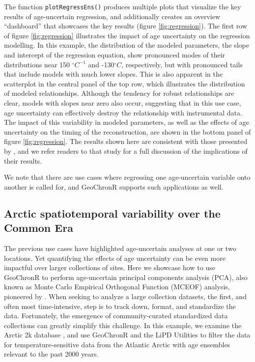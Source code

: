 \documentclass[gchron, manuscript]{copernicus}
\begin{document}
The function \texttt{plotRegressEns()} produces multiple plots that visualize the key results of age-uncertain regression, and additionally creates an overview ``dashboard'' that showcases the key results (figure \ref{fig:regression}).
The first row of figure \ref{fig:regression} illustrates the impact of age uncertainty on the regression modelling.
In this example, the distribution of the modeled parameters, the slope and intercept of the regression equation, show pronounced modes of their distributions near 150 \(^\circ C^{-1}\) and -130\(^\circ C\), respectively, but with pronounced tails that include models with much lower slopes.
This is also apparent in the scatterplot in the central panel of the top row, which illustrates the distribution of modeled relationships.
Although the tendency for robust relationships are clear, models with slopes near zero also occur, suggesting that in this use case, age uncertainty can effectively destroy the relationship with instrumental data.
The impact of this variability in modeled parameters, as well as the effects of age uncertainty on the timing of the reconstruction, are shown in the bottom panel of figure \ref{fig:regression}.
The results shown here are consistent with those presented by \citet{Boldt2015}, and we refer readers to that study for a full discussion of the implications of their results.

We note that there are use cases where regressing one age-uncertain variable onto another is called for, and GeoChronR supports such applications as well.

\hypertarget{sec:pca}{%
\subsection{Arctic spatiotemporal variability over the Common Era}\label{sec:pca}}

The previous use cases have highlighted age-uncertain analyses at one or two locations. Yet quantifying the effects of age uncertainty can be even more impactful over larger collections of sites.
Here we showcase how to use GeoChronR to perform age-uncertain principal components analysis (PCA), also known as Monte Carlo Empirical Orthogonal Function (MCEOF) analysis, pioneered by \citet{anchukaitis2013mceof}.
When seeking to analyze a large collection datasets, the first, and often most time-intensive, step is to track down, format, and standardize the data.
Fortunately, the emergence of community-curated standardized data collections \citetext{\citealp[e.g.][]{PAGES2K_ngeo2013_short}; \citealp{pages2k2017}; \citealp[ ]{kaufman2020temp12k}; \citealp{konecky2020iso2k}} can greatly simplify this challenge.
In this example, we examine the Arctic 2k database \citep{McKayKaufman2014}, and use GeoChronR and the LiPD Utilities to filter the data for temperature-sensitive data from the Atlantic Arctic with age ensembles relevant to the past 2000 years.
\end{document}
